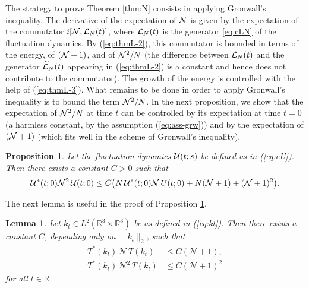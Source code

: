\documentclass[11pt,a4paper]{article}
\newtheorem{proposition}[thm]{Proposition}
\newtheorem{lemma}[thm]{Lemma}
\newtheorem*{rem}{Remark}
\newcommand{\cU}{{\cal U}}
\newcommand{\bR}{{\mathbb R}}
\newcommand{\wt}{\widetilde}
\newcommand{\cL}{{\cal L}}
\newcommand{\cN}{{\cal N}}
\newcommand{\R}{\mathbb{R}}
\newcommand{\N}{\mathcal{N}}
\newcommand{\K}{\mathcal{K}}
\newcommand{\norm}[1]{\lVert#1\rVert}	%
\begin{document}
The strategy to prove Theorem \ref{thm:N} consists in applying Gronwall's
inequality. The derivative of the expectation of $\cN$ is given by the
expectation of the commutator $i[\cN , \cL_N (t)]$, where $\cL_N(t)$ is the
generator \eqref{eq:cLN} of the fluctuation dynamics. By (\ref{eq:thmL-2}),
this commutator  is bounded in terms of the energy, of $(\cN+ 1)$, and of
$\cN^2/N$ (the difference between $\cL_N (t)$ and the generator $\wt{\cL}_N
(t)$ appearing in (\ref{eq:thmL-2}) is a constant and hence does not
contribute to the commutator). The growth of the energy is controlled with
the help of (\ref{eq:thmL-3}). What remains to be done in order to apply
Gronwall's inequality is to bound the term $\cN^2 / N$. In the next
proposition, we show that the expectation of $\cN^2/N$ at time $t$ can be
controlled by its expectation at time $t=0$ (a harmless constant, by the
assumption (\ref{eq:ass-grw})) and by the expectation of $(\cN+1)$ (which
fits well in the scheme of Gronwall's inequality). 

\begin{proposition} \label{prop:apri}
Let the fluctuation dynamics $\cU (t;s)$ be defined as in (\ref{eq:cU}). Then there exists a constant $C > 0$ such that
 \[ \cU^* (t;0) \N^2 \, \cU (t;0) \le C \big( N  \, \cU^* (t;0) \N \, U (t;0) + N (\N+1) + (\N+1)^2 \big).
 \]
\end{proposition}

The next lemma is useful in the proof of Proposition \ref{prop:apri}.
\begin{lemma} \label{lm:TNT}
Let $k_t \in L^2(\R^3 \times \R^3)$ be as defined in (\ref{eq:kt}). Then there exists a constant $C$, depending only on $\| k_t \|_2$, such that
\begin{align}
    T^* (k_t)  \, \N \, T (k_t) & \le C (\N+1), \label{eq:TNT} \\
    T^* (k_t) \, \N^2 \, T (k_t) & \le C (\N+1)^2 \label{eq:TN2T} %
  \end{align}
for all $t \in \bR$.
\end{lemma}

\end{document}
